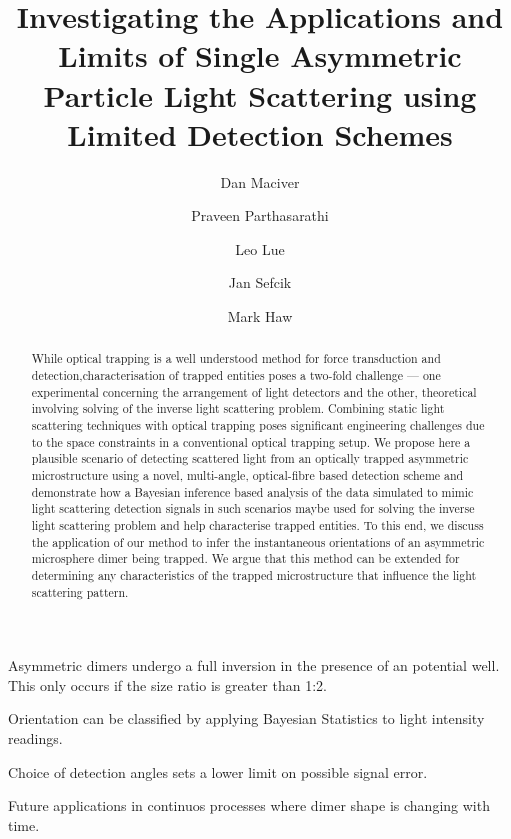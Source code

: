 \documentclass[final, 3p]{elsarticle}
\begin{document}
\begin{frontmatter}

\title{Investigating the Applications and Limits of Single Asymmetric Particle Light Scattering using Limited Detection Schemes}


\author[aff1]{Dan Maciver} 

\author[aff1]{Praveen Parthasarathi}

\author[aff1]{Leo Lue}

\author[aff1]{Jan Sefcik}

\author[aff1]{Mark Haw}






\begin{abstract}
  While optical trapping is a well understood method for force
  transduction and detection,characterisation of trapped entities
  poses a two-fold challenge --- one experimental concerning the
  arrangement of light detectors and the other, theoretical involving
  solving of the inverse light scattering problem. Combining static
  light scattering techniques with optical trapping poses significant
  engineering challenges due to the space constraints in a
  conventional optical trapping setup.  We propose here a plausible
  scenario of detecting scattered light from an optically trapped
  asymmetric microstructure using a novel, multi-angle, optical-fibre
  based detection scheme and demonstrate how a Bayesian inference
  based analysis of the data simulated to mimic light scattering
  detection signals in such scenarios maybe used for solving the
  inverse light scattering problem and help characterise trapped
  entities.  To this end, we discuss the application of our method to
  infer the instantaneous orientations of an asymmetric microsphere
  dimer being trapped. We argue that this method can be extended for
  determining any characteristics of the trapped microstructure that
  influence the light scattering pattern.
\end{abstract}

\begin{highlights}
\item Asymmetric dimers undergo a full inversion in the presence of an potential well. This only occurs if the size ratio is greater than 1:2.  
\item Orientation can be classified by applying Bayesian Statistics to light intensity readings. 
\item Choice of detection angles sets a lower limit on possible signal error. 
\item Future applications in continuos processes where dimer shape is changing with time.   
\end{highlights}


\end{frontmatter}
\end{document}

